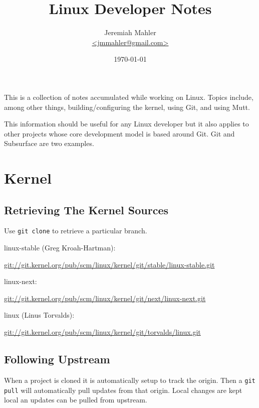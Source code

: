 \documentclass{article}
\begin{document}
\nocite{junio-churn}
\nocite{tso-churn}
\nocite{linus-trivial}
\nocite{topposting}

\title{Linux Developer Notes}
\author{
	\Large{Jeremiah Mahler}\\
	\small{\href{mailto:jmmahler@gmail.com}{\textless jmmahler@gmail.com\textgreater}}
}
\date{\today}
\maketitle
\clearpage

\thispagestyle{empty}
\tableofcontents
\clearpage

This is a collection of notes accumulated while working on Linux.
Topics include, among other things, building/configuring the kernel,
using Git, and using Mutt.

This information should be useful for any Linux developer but it also
applies to other projects whose core development model is based around
Git.
Git\autocite{git} and Subsurface\autocite{subsurface} are two examples.

\section{Kernel}

\subsection{Retrieving The Kernel Sources}

Use \verb+git clone+ to retrieve a particular branch.

linux-stable (Greg Kroah-Hartman):

\url{git://git.kernel.org/pub/scm/linux/kernel/git/stable/linux-stable.git}

linux-next:

\url{git://git.kernel.org/pub/scm/linux/kernel/git/next/linux-next.git}

linux (Linus Torvalds):

\url{git://git.kernel.org/pub/scm/linux/kernel/git/torvalds/linux.git}

\subsection{Following Upstream}

When a project is cloned it is automatically setup to track the origin.
Then a \verb+git pull+ will automatically pull updates from that origin.
Local changes are kept local an updates can be pulled from upstream.
\end{document}
